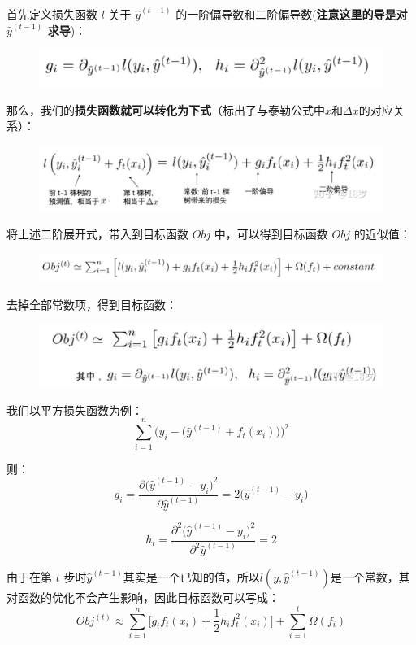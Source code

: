 \documentclass[12pt]{article}
\begin{document}
首先定义损失函数 $l$ 关于 $\hat{y}^{(t-1)}$ 的一阶偏导数和二阶偏导数(\textbf{注意这里的导是对$\hat{y}^{(t-1)}$ 求导})：
\begin{figure}[H]
    \centering
    \includegraphics[width=.8\textwidth]{fig/XGBoost_Eq_Partial_Loss.png}
\end{figure}

那么，我们的\textbf{损失函数就可以转化为下式}（标出了与泰勒公式中$x$和$\Delta x$的对应关系）：
\begin{figure}[H]
    \centering
    \includegraphics[width=.8\textwidth]{fig/XGBoost_Eq_Partial_Loss_Tylor.png}
\end{figure}

将上述二阶展开式，带入到目标函数 $Obj$ 中，可以得到目标函数 $Obj$ 的近似值：
\begin{figure}[H]
    \centering
    \includegraphics[width=.8\textwidth]{fig/XGBoost_Eq_Partial_Loss_Tylor_Obj.png}
\end{figure}

去掉全部常数项，得到目标函数：
\begin{figure}[H]
    \centering
    \includegraphics[width=.8\textwidth]{fig/XGBoost_Eq_Partial_Loss_Tylor_Obj_No_Constants.png}
\end{figure}

\begin{framed}
我们以平方损失函数为例：
$$
\sum_{i=1}^n\Bigg(y_i - \Big(\hat{y}^{(t-1)} + f_t(x_i)\Big)\Bigg)^2
$$

则：
$$
g_i = \frac{\partial \Big(\hat{y}^{(t-1)} - y_i\Big)^2}{\partial \hat{y}^{(t-1)}} = 2\Big(\hat{y}^{(t-1)} - y_i\Big)
$$

$$
h_i = \frac{\partial^2 \Big(\hat{y}^{(t-1)} - y_i\Big)^2}{\partial^2 \hat{y}^{(t-1)}} = 2
$$

由于在第 $t$ 步时$\hat{y}^{(t-1)}$其实是一个已知的值，所以$l(y, \hat{y}^{(t-1)})$是一个常数，其对函数的优化不会产生影响，因此目标函数可以写成：
$$
Obj^{(t)} \approx \sum_{i=1}^n\Bigg[ g_i f_t (x_i) + \frac{1}{2}h_if^2_t(x_i)\Bigg] + \sum_{i=1}^t\Omega(f_i)
$$


\end{framed}
\end{document}
